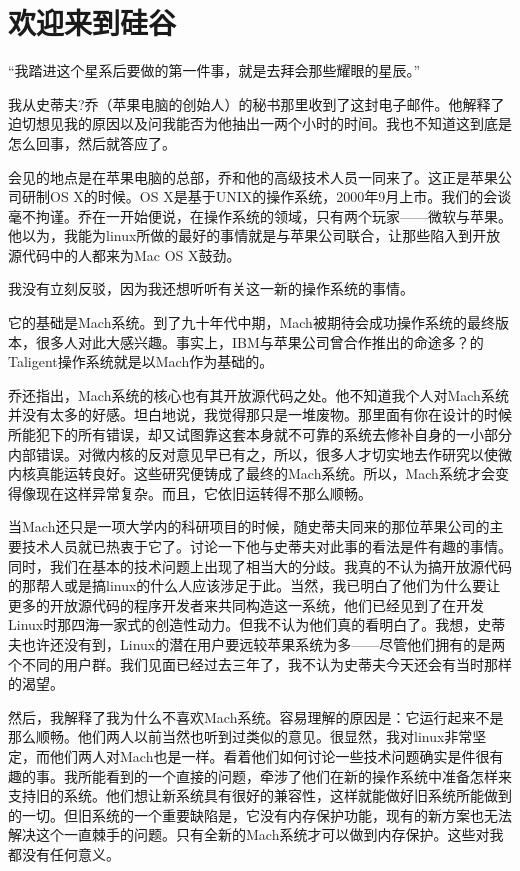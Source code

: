  
\section{欢迎来到硅谷}

“我踏进这个星系后要做的第一件事，就是去拜会那些耀眼的星辰。”

我从史蒂夫?乔（苹果电脑的创始人）的秘书那里收到了这封电子邮件。他解释了迫切想见我的原因以及问我能否为他抽出一两个小时的时间。我也不知道这到底是怎么回事，然后就答应了。

会见的地点是在苹果电脑的总部，乔和他的高级技术人员一同来了。这正是苹果公司研制OS X的时候。OS X是基于UNIX的操作系统，2000年9月上市。我们的会谈毫不拘谨。乔在一开始便说，在操作系统的领域，只有两个玩家——微软与苹果。他以为，我能为linux所做的最好的事情就是与苹果公司联合，让那些陷入到开放源代码中的人都来为Mac OS X鼓劲。

我没有立刻反驳，因为我还想听听有关这一新的操作系统的事情。

它的基础是Mach系统。到了九十年代中期，Mach被期待会成功操作系统的最终版本，很多人对此大感兴趣。事实上，IBM与苹果公司曾合作推出的命途多？的Taligent操作系统就是以Mach作为基础的。

乔还指出，Mach系统的核心也有其开放源代码之处。他不知道我个人对Mach系统并没有太多的好感。坦白地说，我觉得那只是一堆废物。那里面有你在设计的时候所能犯下的所有错误，却又试图靠这套本身就不可靠的系统去修补自身的一小部分内部错误。对微内核的反对意见早已有之，所以，很多人才切实地去作研究以使微内核真能运转良好。这些研究便铸成了最终的Mach系统。所以，Mach系统才会变得像现在这样异常复杂。而且，它依旧运转得不那么顺畅。

当Mach还只是一项大学内的科研项目的时候，随史蒂夫同来的那位苹果公司的主要技术人员就已热衷于它了。讨论一下他与史蒂夫对此事的看法是件有趣的事情。同时，我们在基本的技术问题上出现了相当大的分歧。我真的不认为搞开放源代码的那帮人或是搞linux的什么人应该涉足于此。当然，我已明白了他们为什么要让更多的开放源代码的程序开发者来共同构造这一系统，他们已经见到了在开发Linux时那四海一家式的创造性动力。但我不认为他们真的看明白了。我想，史蒂夫也许还没有到，Linux的潜在用户要远较苹果系统为多——尽管他们拥有的是两个不同的用户群。我们见面已经过去三年了，我不认为史蒂夫今天还会有当时那样的渴望。

然后，我解释了我为什么不喜欢Mach系统。容易理解的原因是：它运行起来不是那么顺畅。他们两人以前当然也听到过类似的意见。很显然，我对linux非常坚定，而他们两人对Mach也是一样。看着他们如何讨论一些技术问题确实是件很有趣的事。我所能看到的一个直接的问题，牵涉了他们在新的操作系统中准备怎样来支持旧的系统。他们想让新系统具有很好的兼容性，这样就能做好旧系统所能做到的一切。但旧系统的一个重要缺陷是，它没有内存保护功能，现有的新方案也无法解决这个一直棘手的问题。只有全新的Mach系统才可以做到内存保护。这些对我都没有任何意义。

